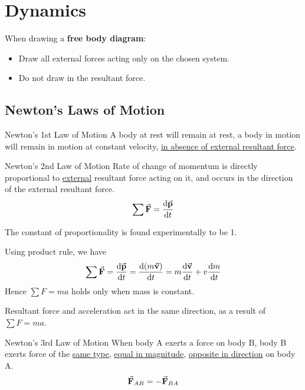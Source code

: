 \section{Dynamics}
When drawing a \textbf{free body diagram}:
\begin{itemize}
	\item Draw all external forces acting only on the chosen system.
	\item Do not draw in the resultant force.
\end{itemize}

\subsection{Newton's Laws of Motion}
\begin{defn}{Newton's 1st Law of Motion}{}
A body at rest will remain at rest, a body in motion will remain in motion at constant velocity, \underline{in absence of external resultant force}. 
\end{defn} 

\begin{defn}{Newton's 2nd Law of Motion}{}
Rate of change of momentum is directly proportional to \underline{external} resultant force acting on it, and occurs in the direction of the external resultant force. 
\begin{equation} \sum \va{F} = \dv{\va{p}}{t} \end{equation}
\begin{remark} The constant of proportionality is found experimentally to be 1. \end{remark}
\end{defn}
\begin{remark}
Using product rule, we have 
\[ \sum \va{F} = \dv{\va{p}}{t} = \dv{(m\va{v})}{t} = m\dv{\va{v}}{t} + v\dv{m}{t} \]
Hence $\sum F = ma$ holds only when mass is constant.
\end{remark}

\begin{remark}
Resultant force and acceleration act in the same direction, as a result of $\sum F=ma$.
\end{remark}

\begin{defn}{Newton's 3rd Law of Motion}{}
When body A exerts a force on body B, body B exerts force of the \underline{same type}, \underline{equal in magnitude}, \underline{opposite in direction} on body A. 
\begin{equation} \va{F}_{AB} = - \va{F}_{BA} \end{equation}
\end{defn}

